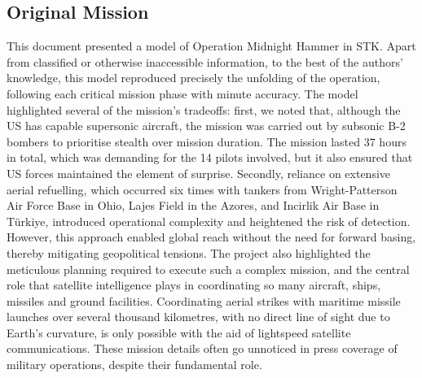 \documentclass{article}
\newif\ifpartB
\begin{document}
\subsection{Original Mission}
\fi
This document presented a model of Operation Midnight Hammer in STK. Apart from classified or otherwise inaccessible information, to the best of the authors' knowledge, this model reproduced precisely the unfolding of the operation, following each critical mission phase with minute accuracy. The model highlighted several of the mission's tradeoffs: first, we noted that, although the US has capable supersonic aircraft, the mission was carried out by subsonic B-2 bombers to prioritise stealth over mission duration. The mission lasted 37 hours in total, which was demanding for the 14 pilots involved, but it also ensured that US forces maintained the element of surprise. Secondly, reliance on extensive aerial refuelling, which occurred six times with tankers from Wright-Patterson Air Force Base in Ohio, Lajes Field in the Azores, and Incirlik Air Base in Türkiye, introduced operational complexity and heightened the risk of detection. However, this approach enabled global reach without the need for forward basing, thereby mitigating geopolitical tensions. The project also highlighted the meticulous planning required to execute such a complex mission, and the central role that satellite intelligence plays in coordinating so many aircraft, ships, missiles and ground facilities. Coordinating aerial strikes with maritime missile launches over several thousand kilometres, with no direct line of sight due to Earth's curvature, is only possible with the aid of lightspeed satellite communications. These mission details often go unnoticed in press coverage of military operations, despite their fundamental role.

\ifpartB
\end{document}
